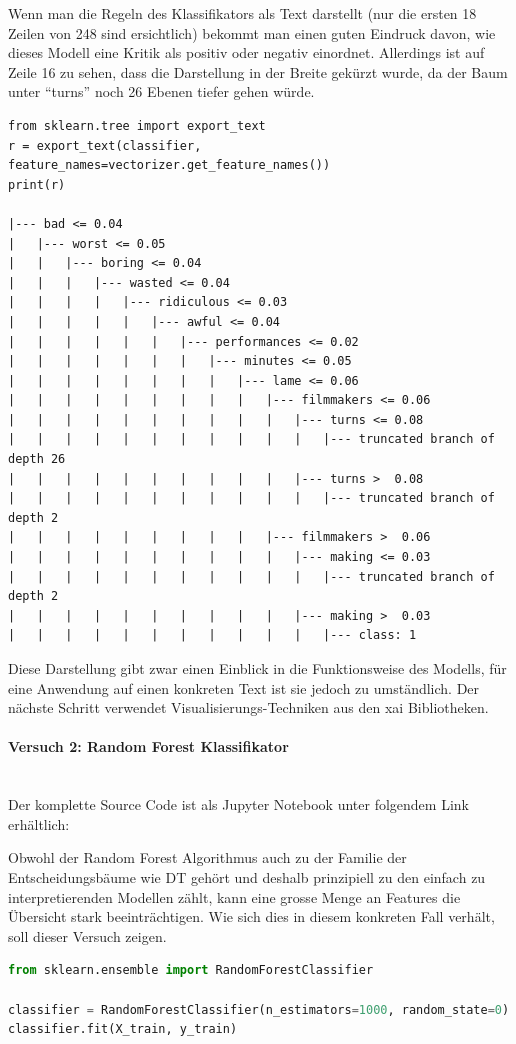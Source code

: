 \documentclass[
  12pt, %
  a4paper, %
  oneside, %
  openany, 
  numbers=noenddot, %
  BCOR=5mm, %
  parskip=half*, %
  thesis, %
]{bfhbook}
\newcommand{\parag}[1]{\paragraph*{#1}\mbox{}\\}
\begin{document}
Wenn man die Regeln des Klassifikators als Text darstellt (nur die ersten 18 Zeilen von 248 sind ersichtlich) bekommt man einen guten Eindruck davon, wie dieses Modell eine Kritik als positiv oder negativ einordnet. Allerdings ist auf Zeile 16 zu sehen, dass die Darstellung in der Breite gekürzt wurde, da der Baum unter ``turns'' noch 26 Ebenen tiefer gehen würde.
\begin{lstlisting}
from sklearn.tree import export_text
r = export_text(classifier, feature_names=vectorizer.get_feature_names())
print(r)

|--- bad <= 0.04
|   |--- worst <= 0.05
|   |   |--- boring <= 0.04
|   |   |   |--- wasted <= 0.04
|   |   |   |   |--- ridiculous <= 0.03
|   |   |   |   |   |--- awful <= 0.04
|   |   |   |   |   |   |--- performances <= 0.02
|   |   |   |   |   |   |   |--- minutes <= 0.05
|   |   |   |   |   |   |   |   |--- lame <= 0.06
|   |   |   |   |   |   |   |   |   |--- filmmakers <= 0.06
|   |   |   |   |   |   |   |   |   |   |--- turns <= 0.08
|   |   |   |   |   |   |   |   |   |   |   |--- truncated branch of depth 26
|   |   |   |   |   |   |   |   |   |   |--- turns >  0.08
|   |   |   |   |   |   |   |   |   |   |   |--- truncated branch of depth 2
|   |   |   |   |   |   |   |   |   |--- filmmakers >  0.06
|   |   |   |   |   |   |   |   |   |   |--- making <= 0.03
|   |   |   |   |   |   |   |   |   |   |   |--- truncated branch of depth 2
|   |   |   |   |   |   |   |   |   |   |--- making >  0.03
|   |   |   |   |   |   |   |   |   |   |   |--- class: 1
\end{lstlisting}
Diese Darstellung gibt zwar einen Einblick in die Funktionsweise des Modells, für eine Anwendung auf einen konkreten Text ist sie jedoch zu umständlich. Der nächste Schritt verwendet Visualisierungs-Techniken aus den \Gls{xai} Bibliotheken.

\parag{Versuch 2: Random Forest Klassifikator}
Der komplette Source Code ist als Jupyter Notebook unter folgendem Link erhältlich: \parencite{textClassEli5}

Obwohl der Random Forest Algorithmus auch zu der Familie der Entscheidungsbäume wie \Gls{DT} gehört und deshalb prinzipiell zu den einfach zu interpretierenden Modellen zählt, kann eine grosse Menge an Features die Übersicht stark beeinträchtigen. Wie sich dies in diesem konkreten Fall verhält, soll dieser Versuch zeigen.
\begin{lstlisting}[language=Python]
from sklearn.ensemble import RandomForestClassifier

classifier = RandomForestClassifier(n_estimators=1000, random_state=0)
classifier.fit(X_train, y_train)
\end{lstlisting}
\end{document}
